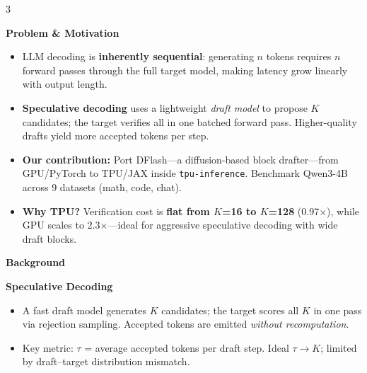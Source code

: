 \documentclass[12pt]{article}
\newcommand{\posterbody}{\fontsize{24}{29}\selectfont}
\newcommand{\posteritem}{\fontsize{22}{27}\selectfont}
\newcommand{\postersection}{\fontsize{32}{38}\selectfont}
\newcommand{\postersubsection}{\fontsize{26}{31}\selectfont}
\newcommand{\posterblock}[1]{%
  \vspace{6pt}%
  \noindent\colorbox{panelbg}{\parbox{\dimexpr\linewidth-2\fboxsep}{%
    \vspace{3pt}\centering\color{navy}\bfseries\postersection #1\vspace{3pt}}}%
  \vspace{3pt}\par\nobreak%
}
\begin{document}
\begin{multicols*}{3}
\color{darktext}
\posterbody


\posterblock{Problem \& Motivation}

\posteritem
\begin{itemize}\setlength\itemsep{4pt}
  \item LLM decoding is \textbf{inherently sequential}: generating $n$ tokens
        requires $n$ forward passes through the full target model, making
        latency grow linearly with output length.
  \item \textbf{Speculative decoding} uses a lightweight \emph{draft model}
        to propose $K$ candidates; the target verifies all in one batched
        forward pass. Higher-quality drafts yield more accepted tokens per step.
  \item \textbf{Our contribution:} Port DFlash---a diffusion-based block
        drafter---from GPU/PyTorch to TPU/JAX inside \texttt{tpu-inference}.
        Benchmark Qwen3-4B across 9 datasets (math, code, chat).
  \item \textbf{Why TPU?} Verification cost is \textbf{flat from $K$=16 to
        $K$=128} (0.97$\times$), while GPU scales to 2.3$\times$---ideal for
        aggressive speculative decoding with wide draft blocks.
\end{itemize}

\posterblock{Background}

\posteritem
{\postersubsection\bfseries\color{navy} Speculative Decoding\par}\vspace{1pt}
\begin{itemize}\setlength\itemsep{3pt}
  \item A fast draft model generates $K$ candidates; the target scores all
        $K$ in one pass via rejection sampling.  Accepted tokens are emitted
        \emph{without recomputation}.
  \item Key metric: $\tau$ = average accepted tokens per draft step.
        Ideal $\tau \to K$; limited by draft--target distribution mismatch.
\end{itemize}


\end{multicols*}
\end{document}
